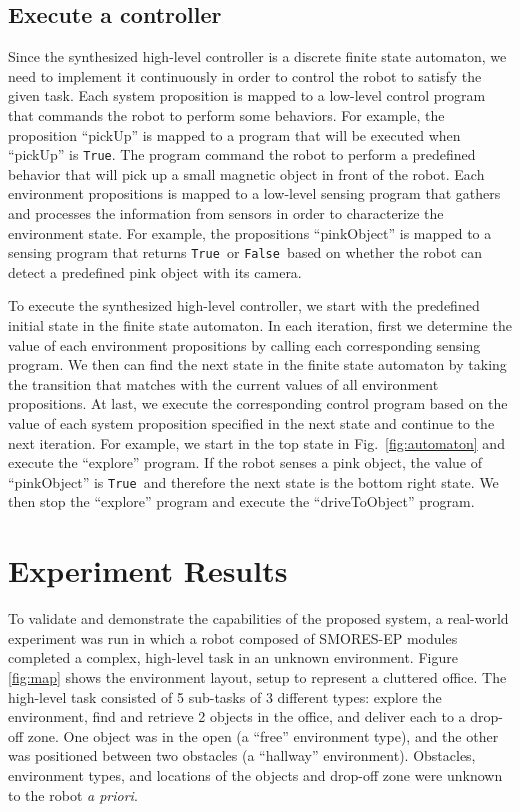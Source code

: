 \documentclass[conference]{IEEEtran}
\newcommand{\lt}{{\tt True }}
\newcommand{\lf}{{\tt False }}
\newcommand{\ltnsp}{{\tt True}}
\begin{document}
\subsection{Execute a controller}
Since the synthesized high-level controller is a discrete finite state automaton, we need to implement it continuously in order to control the robot to satisfy the given task. 
Each system proposition is mapped to a low-level control program that commands the robot to perform some behaviors.
For example, the proposition ``pickUp'' is mapped to a program that will be executed when ``pickUp'' is \ltnsp. The program command the robot to perform a predefined behavior that will pick up a small magnetic object in front of the robot.
Each environment propositions is mapped to a low-level sensing program that gathers and processes the information from sensors in order to characterize the environment state.
For example, the propositions ``pinkObject'' is mapped to a sensing program that returns \lt or \lf based on whether the robot can detect a predefined pink object with its camera.

To execute the synthesized high-level controller, we start with the predefined initial state in the finite state automaton.
In each iteration, first we determine the value of each environment propositions by calling each corresponding sensing program.
We then can find the next state in the finite state automaton by taking the transition that matches with the current values of all environment propositions.
At last, we execute the corresponding control program based on the value of each system proposition specified in the next state and continue to the next iteration.
For example, we start in the top state in Fig.~\ref{fig:automaton} and execute the ``explore'' program.
If the robot senses a pink object, the value of ``pinkObject'' is \lt and therefore the next state is the bottom right state. We then stop the ``explore'' program and execute the ``driveToObject'' program.

\section{Experiment Results}
\label{sec:experiments}
%
To validate and demonstrate the capabilities of the proposed system, a real-world experiment was run in which a robot composed of SMORES-EP modules completed a complex, high-level task in an unknown environment. Figure \ref{fig:map} shows the environment layout, setup to represent a cluttered office. The high-level task consisted of 5 sub-tasks of 3 different types: explore the environment, find and retrieve 2 objects in the office, and deliver each to a drop-off zone. One object was in the open (a ``free'' environment type), and the other was positioned between two obstacles (a ``hallway'' environment). Obstacles, environment types, and locations of the objects and drop-off zone were unknown to the robot \textit{a priori}.
\end{document}
